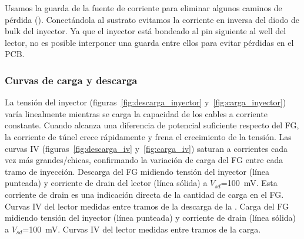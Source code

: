Usamos la guarda de la fuente de corriente para eliminar algunos caminos de pérdida
().
Conectándola al sustrato evitamos la corriente en inversa del diodo de bulk
del inyector.
Ya que el inyector está bondeado al pin siguiente al well del lector,
no es posible interponer una guarda entre ellos para evitar pérdidas en el PCB.
\subsubsection{Curvas de carga y descarga}
La tensión del inyector (figuras~\ref{fig:descarga_inyector}
y~\ref{fig:carga_inyector})
varía linealmente mientras se carga la capacidad de los cables a corriente
constante.
Cuando alcanza una diferencia de potencial suficiente respecto del FG,
la corriente de túnel crece rápidamente y frena el crecimiento de la tensión.
Las curvas IV (figuras~\ref{fig:descarga_iv}
y~\ref{fig:carga_iv}) saturan a corrientes cada vez más grandes/chicas,
confirmando la variación de carga del FG entre cada tramo
de inyección.
{Descarga del FG midiendo tensión del inyector (línea punteada) y
corriente de drain del lector (línea sólida) a
$V_{sd}$=\SI{100}{\milli\volt}.
Esta corriente de drain es una indicación directa 
de la cantidad de carga en el FG.}
{Curvas IV del lector medidas entre tramos de la descarga
    de la .}
{Carga del FG midiendo tensión del inyector (línea punteada) y
corriente de drain (línea sólida) a
$V_{sd}$=\SI{100}{\milli\volt}.}
{Curvas IV del lector medidas entre tramos de la carga.}
